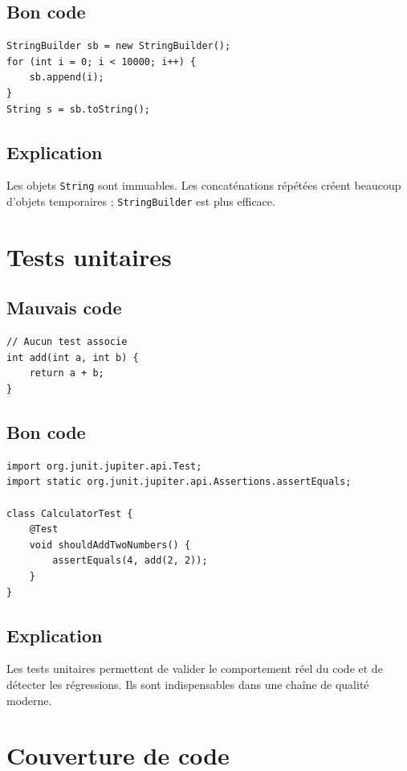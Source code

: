\documentclass[a4paper,11pt]{report}
\begin{document}
\section{Bon code}
\begin{lstlisting}
StringBuilder sb = new StringBuilder();
for (int i = 0; i < 10000; i++) {
    sb.append(i);
}
String s = sb.toString();
\end{lstlisting}

\section{Explication}
Les objets \texttt{String} sont immuables.
Les concaténations répétées créent beaucoup d'objets temporaires ; \texttt{StringBuilder} est plus efficace.

\chapter{Tests unitaires}

\section{Mauvais code}
\begin{lstlisting}
// Aucun test associe
int add(int a, int b) {
    return a + b;
}
\end{lstlisting}

\section{Bon code}
\begin{lstlisting}
import org.junit.jupiter.api.Test;
import static org.junit.jupiter.api.Assertions.assertEquals;

class CalculatorTest {
    @Test
    void shouldAddTwoNumbers() {
        assertEquals(4, add(2, 2));
    }
}
\end{lstlisting}

\section{Explication}
Les tests unitaires permettent de valider le comportement réel du code et de détecter les régressions.
Ils sont indispensables dans une chaîne de qualité moderne.

\chapter{Couverture de code}
\end{document}
